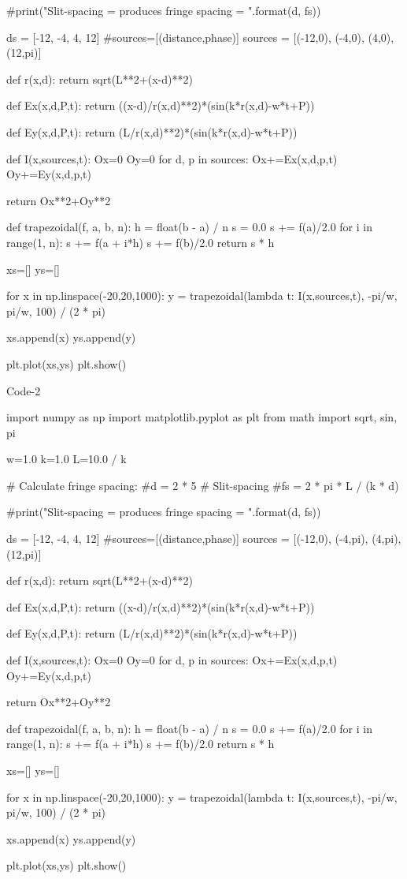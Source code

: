 #print("Slit-spacing = {} produces fringe spacing = {}".format(d, fs))


ds = [-12, -4, 4, 12]
#sources=[(distance,phase)]
sources = [(-12,0), (-4,0), (4,0), (12,pi)]

def r(x,d):
    return sqrt(L**2+(x-d)**2)
    
def Ex(x,d,P,t):
    return ((x-d)/r(x,d)**2)*(sin(k*r(x,d)-w*t+P))
   
def Ey(x,d,P,t):
    return (L/r(x,d)**2)*(sin(k*r(x,d)-w*t+P))
       
def I(x,sources,t):
    Ox=0
    Oy=0
    for d, p in sources:
        Ox+=Ex(x,d,p,t)
        Oy+=Ey(x,d,p,t)
    
    return Ox**2+Oy**2
        
    
def trapezoidal(f, a, b, n):
    h = float(b - a) / n
    s = 0.0
    s += f(a)/2.0
    for i in range(1, n):
        s += f(a + i*h)
    s += f(b)/2.0
    return s * h

xs=[]
ys=[]

for x in np.linspace(-20,20,1000):
    y = trapezoidal(lambda t: I(x,sources,t), -pi/w, pi/w, 100) / (2 * pi)
   
    xs.append(x)
    ys.append(y)

plt.plot(xs,ys)
plt.show()   

Code-2

import numpy as np
import matplotlib.pyplot as plt
from math import sqrt, sin, pi

w=1.0
k=1.0
L=10.0 / k

# Calculate fringe spacing:
#d = 2 * 5           
# Slit-spacing
#fs = 2 * pi * L / (k * d)

#print("Slit-spacing = {} produces fringe spacing = {}".format(d, fs))


ds = [-12, -4, 4, 12]
#sources=[(distance,phase)]
sources = [(-12,0), (-4,pi), (4,pi), (12,pi)]

def r(x,d):
    return sqrt(L**2+(x-d)**2)
    
def Ex(x,d,P,t):
    return ((x-d)/r(x,d)**2)*(sin(k*r(x,d)-w*t+P))
   
def Ey(x,d,P,t):
    return (L/r(x,d)**2)*(sin(k*r(x,d)-w*t+P))
       
def I(x,sources,t):
    Ox=0
    Oy=0
    for d, p in sources:
        Ox+=Ex(x,d,p,t)
        Oy+=Ey(x,d,p,t)
    
    return Ox**2+Oy**2
        
    
def trapezoidal(f, a, b, n):
    h = float(b - a) / n
    s = 0.0
    s += f(a)/2.0
    for i in range(1, n):
        s += f(a + i*h)
    s += f(b)/2.0
    return s * h

xs=[]
ys=[]

for x in np.linspace(-20,20,1000):
    y = trapezoidal(lambda t: I(x,sources,t), -pi/w, pi/w, 100) / (2 * pi)
   
    xs.append(x)
    ys.append(y)

plt.plot(xs,ys)
plt.show()
